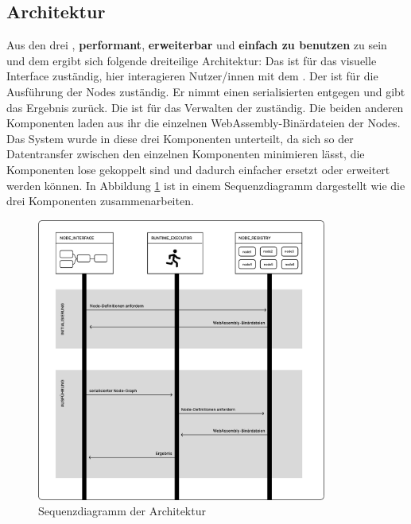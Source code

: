\documentclass[ngerman]{article}
\begin{document}
\pagebreak


\subsection{Architektur}
\label{sec:Architektur}
Aus den drei , \textbf{performant}, \textbf{erweiterbar} und \textbf{einfach zu benutzen} zu sein und dem  ergibt sich folgende dreiteilige Architektur:
\br
Das \textbf{} ist für das visuelle Interface zuständig, hier interagieren Nutzer/innen mit dem .
\br
Der \textbf{} ist für die Ausführung der Nodes zuständig. Er nimmt einen serialisierten  entgegen und gibt das Ergebnis zurück.
\br
Die \textbf{} ist für das Verwalten der  zuständig. Die beiden anderen Komponenten laden aus ihr die einzelnen WebAssembly-Binärdateien der Nodes.
\br
Das System wurde in diese drei Komponenten unterteilt, da sich so der Datentransfer zwischen den einzelnen Komponenten minimieren lässt, die Komponenten lose gekoppelt sind und dadurch einfacher ersetzt oder erweitert werden können.
In Abbildung \ref{fig:overview_sequence} ist in einem Sequenzdiagramm dargestellt wie die drei Komponenten zusammenarbeiten.

\begin{figure}[hbtp]
    \centering
    \includegraphics[width=0.85\textwidth]{graphics/OVERVIEW_SEQUENCE.pdf}
    \caption{Sequenzdiagramm der Architektur}
    \label{fig:overview_sequence}
\end{figure}
\end{document}
